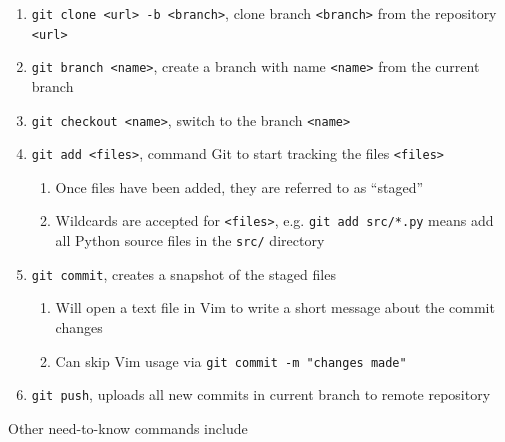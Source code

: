 \documentclass[11pt]{article}
\begin{document}
\begin{enumerate}
    \item \texttt{git clone <url> -b <branch>}, clone branch \texttt{<branch>} from the repository \texttt{<url>}
    \item \texttt{git branch <name>}, create a branch with name \texttt{<name>} from the current branch
    \item \texttt{git checkout <name>}, switch to the branch \texttt{<name>}
    \item \texttt{git add <files>}, command Git to start tracking the files \texttt{<files>}
    \begin{enumerate}
        \item Once files have been added, they are referred to as ``staged''
        \item Wildcards are accepted for \texttt{<files>}, e.g. \texttt{git add src/*.py} means add all Python source files in the \texttt{src/} directory
    \end{enumerate}
    \item \texttt{git commit}, creates a snapshot of the staged files
    \begin{enumerate}
        \item Will open a text file in Vim to write a short message about the commit changes
        \item Can skip Vim usage via \texttt{git commit -m "changes made"}
    \end{enumerate}
    \item \texttt{git push}, uploads all new commits in current branch to remote repository
\end{enumerate}

\noindent
Other need-to-know commands include
\end{document}
